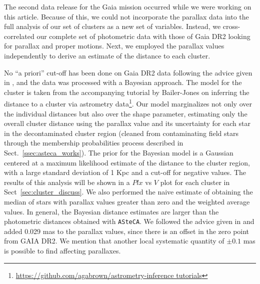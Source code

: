 \documentclass{aa}
\begin{document}
The second data release for the Gaia mission \citep{GaiaDR2_2018} occurred while
we were working on this article. Because of this, we could not incorporate the
parallax data into the full analysis of our set of clusters as a new set of
variables. Instead, we cross-correlated our complete set of photometric data
with those of Gaia DR2 looking for parallax and proper motions. Next, we
employed the parallax values independently to derive an estimate of the distance
to each cluster.

No ``a priori'' cut-off has been done on Gaia DR2 data
following the advice given in \cite{Luri_2018}, and the data was processed with
a Bayesian approach. The model for the cluster is taken from the accompanying
tutorial by Bailer-Jones on inferring the distance to a cluster via astrometry
data\footnote{\url{https://github.com/agabrown/astrometry-inference tutorials}}.
Our model marginalizes not only over the
individual distances but also over the shape parameter, estimating only the
overall cluster distance using the parallax value and its uncertainty for each
star in the decontaminated cluster region (cleaned from contaminating field
stars through the membership probabilities process described in
Sect.~\ref{ssec:asteca_works}).
The prior for the Bayesian model is a Gaussian centered at a maximum likelihood
estimate of the distance to the cluster region, with a large standard deviation
of 1 Kpc and a cut-off for negative values. The results of this analysis will
be shown in a $Plx$ vs $V$ plot for each cluster in
Sect~\ref{sec:cluster_discuss}. We also performed the naive
estimate of obtaining the median of stars with parallax values greater than zero
and the weighted average values. In general, the Bayesian distance estimates are
larger than the photometric distances obtained with \texttt{ASteCA}. We followed
the advice given in \cite{Lindegren_2018} and added 0.029 mas to the parallax
values, since there is an offset in the zero point from GAIA DR2. We mention
that another local systematic quantity of $\pm0.1$ mas is possible to find
affecting parallaxes.\\
\end{document}
